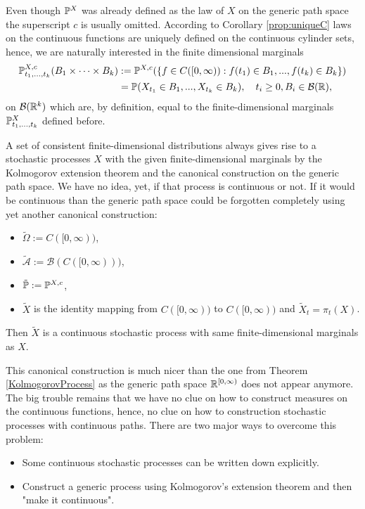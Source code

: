 Even though $\P^X$ was already defined as the law of $X$ on the generic path space the superscript $c$ is usually omitted. According to Corollary \ref{prop:uniqueC} laws on the continuous functions are uniquely defined on the continuous cylinder sets, hence, we are naturally interested in the finite 
dimensional marginals
\begin{align*}
	\P^{X,c}_{t_1,...,t_k}(B_1\times \cdots \times B_{k})&:= \P^{X,c}(\{f\in C([0,\infty)): f(t_1)\in B_1,... ,f(t_k)\in B_k\})\\
	&= \P(X_{t_1}\in B_1,...,X_{t_k}\in B_k),\quad t_i\geq 0, B_i\in \mathcal B(\R),
\end{align*}
on $\mathcal B(\R^k)$ which are, by definition, equal to the finite-dimensional marginals $\P^{X}_{t_1,...,t_k}$ defined before.
\begin{lwarnhinweis}
	A set of consistent finite-dimensional distributions always gives rise to a stochastic processes $X$ with the given finite-dimensional marginals by the Kolmogorov extension theorem and the canonical construction on the generic path space. We have no idea, yet, if that process is continuous or not. If it would be continuous than the generic path space could be forgotten completely using yet another canonical construction:
	\begin{itemize}
		\item $\tilde \Omega:=C([0,\infty))$,
		\item $\tilde{\mathcal A}:=\mathcal B(C([0,\infty)))$,
		\item $\tilde{\P}:=\P^{X,c}$,
		\item $\tilde X$ is the identity mapping from $C([0,\infty))$ to $C([0,\infty))$ and $\tilde X_t=\pi_t(X)$.
	\end{itemize}
	Then $\tilde X$ is a continuous stochastic process with same finite-dimensional marginals as $X$.
\end{lwarnhinweis}
This canonical construction is much nicer than the one from Theorem \ref{KolmogorovProcess} as the generic path space $\R^{[0,\infty)}$ does not appear anymore. The big trouble remains that we have no clue on how to construct measures on the continuous functions, hence, no clue on how to construction stochastic processes with continuous paths. There are two major ways to overcome this problem: 
\begin{itemize}
	\item Some continuous stochastic processes can be written down explicitly.
	\item Construct a generic process using Kolmogorov's extension theorem and then "make it continuous"{}.
\end{itemize}
